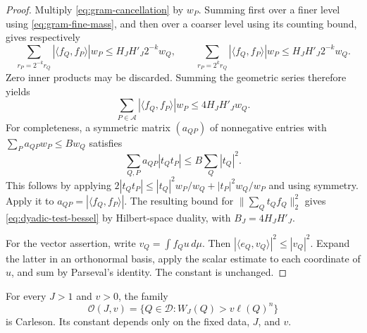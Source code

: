 \begin{proof}
Multiply \eqref{eq:gram-cancellation} by $w_P$. Summing first over a
finer level using \eqref{eq:gram-fine-mass}, and then over a coarser level
using its counting bound, gives respectively
\[
 \sum_{r_P=2^{-k}r_Q}|\langle f_Q,f_P\rangle|w_P
 \le H_JH'_J2^{-k}w_Q,
 \qquad
 \sum_{r_P=2^kr_Q}|\langle f_Q,f_P\rangle|w_P
 \le H_JH'_J2^{-k}w_Q.
\]
Zero inner products may be discarded. Summing the geometric series
therefore yields
\[
 \sum_{P\in\mathcal A}|\langle f_Q,f_P\rangle|w_P
 \le4H_JH'_Jw_Q.
\]
For completeness, a symmetric matrix $(a_{QP})$ of nonnegative entries
with $\sum_P a_{QP}w_P\le Bw_Q$ satisfies
\[
 \sum_{Q,P}a_{QP}|t_Qt_P|\le B\sum_Q|t_Q|^2.
\]
This follows by applying
$2|t_Qt_P|\le |t_Q|^2w_P/w_Q+|t_P|^2w_Q/w_P$ and using symmetry.
Apply it to $a_{QP}=|\langle f_Q,f_P\rangle|$. The resulting bound for
$\|\sum_Qt_Qf_Q\|_2^2$ gives \eqref{eq:dyadic-test-bessel} by Hilbert-space
duality, with $B_J=4H_JH'_J$.

For the vector assertion, write $v_Q=\int f_Qu\,d\mu$. Then
$|\langle e_Q,v_Q\rangle|^2\le|v_Q|^2$. Expand the latter in an
orthonormal basis, apply the scalar estimate to each coordinate of $u$,
and sum by Parseval's identity. The constant is unchanged.
\end{proof}

\begin{proposition}\label{prop:oscillation-packing}
For every $J>1$ and $v>0$, the family
\[
 \mathcal O(J,v)=\{Q\in\mathcal D:W_J(Q)>v\ell(Q)^n\}
\]
is Carleson. Its constant depends only on the fixed data, $J$, and $v$.
\end{proposition}

